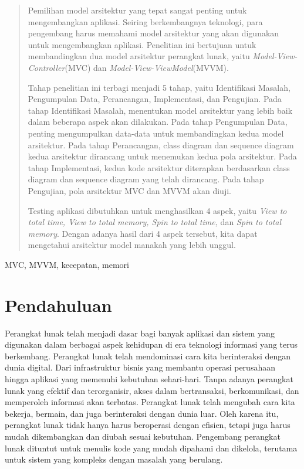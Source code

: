 \documentclass[conference]{IEEEtran}
\begin{document}
	\begin{abstract}
		Pemilihan model arsitektur yang tepat sangat penting untuk mengembangkan aplikasi. Seiring berkembangnya teknologi, para pengembang harus memahami model arsitektur yang akan digunakan untuk mengembangkan aplikasi. Penelitian ini bertujuan untuk membandingkan dua model arsitektur perangkat lunak, yaitu \textit{Model-View-Controller}(MVC) dan \textit{Model-View-ViewModel}(MVVM). 
		
		Tahap penelitian ini terbagi menjadi 5 tahap, yaitu Identifikasi Masalah, Pengumpulan Data, Perancangan, Implementasi, dan Pengujian. Pada tahap Identifikasi Masalah, menentukan model arsitektur yang lebih baik dalam beberapa aspek akan dilakukan.  Pada tahap Pengumpulan Data, penting mengumpulkan data-data untuk membandingkan kedua model arsitektur. Pada tahap Perancangan, class diagram dan sequence diagram kedua arsitektur dirancang untuk menemukan kedua pola arsitektur. Pada tahap Implementasi, kedua kode arsitektur diterapkan berdasarkan class diagram dan sequence diagram yang telah dirancang. Pada tahap Pengujian, pola arsitektur MVC dan MVVM akan diuji.
		
		Testing aplikasi dibutuhkan untuk menghasilkan 4 aspek, yaitu \textit{View to total time, View to total memory, Spin to total time,} dan \textit{Spin to total memory}. Dengan adanya hasil dari 4 aspek tersebut, kita dapat mengetahui arsitektur model manakah yang lebih unggul.
		
		
	\end{abstract}
	
	\begin{IEEEkeywords}
		MVC, MVVM, kecepatan, memori
	\end{IEEEkeywords}
	
	\section{Pendahuluan}
	
	Perangkat lunak telah menjadi dasar bagi banyak aplikasi dan sistem yang digunakan dalam berbagai aspek kehidupan di era teknologi informasi yang terus berkembang. Perangkat lunak telah mendominasi cara kita berinteraksi dengan dunia digital. Dari infrastruktur bisnis yang membantu operasi perusahaan hingga aplikasi yang memenuhi kebutuhan sehari-hari. Tanpa adanya perangkat lunak yang efektif dan terorganisir, akses dalam bertransaksi, berkomunikasi, dan memperoleh informasi akan terbatas. Perangkat lunak telah mengubah cara kita bekerja, bermain, dan juga berinteraksi dengan dunia luar.  Oleh karena itu, perangkat lunak tidak hanya harus beroperasi dengan efisien, tetapi juga harus mudah dikembangkan dan diubah sesuai kebutuhan. Pengembang perangkat lunak dituntut untuk menulis kode yang mudah dipahami dan dikelola, terutama untuk sistem yang kompleks dengan masalah yang berulang.
	
\end{document}
